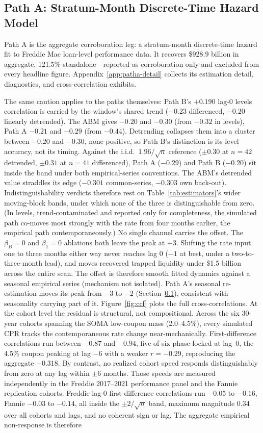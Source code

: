 \documentclass[12pt]{article}
\begin{document}
\subsection{Path A: Stratum-Month Discrete-Time Hazard Model}\label{sec:patha}

Path A is the aggregate corroboration leg: a stratum-month discrete-time hazard fit to Freddie Mac loan-level performance data. It recovers \$928.9 billion in aggregate, 121.5\% standalone---reported as corroboration only and excluded from every headline figure. Appendix~\ref{app:patha-detail} collects its estimation detail, diagnostics, and cross-correlation exhibits.

The same caution applies to the paths themselves: Path B's $+0.190$ lag-0 levels correlation is carried by the window's shared trend ($-0.23$ differenced, $-0.20$ linearly detrended). The ABM gives $-0.20$ and $-0.30$ (from $-0.32$ in levels), Path A $-0.21$ and $-0.29$ (from $-0.44$). Detrending collapses them into a cluster between $-0.20$ and $-0.30$, none positive, so Path B's distinction is its level accuracy, not its timing. Against the i.i.d.\ $1.96/\sqrt{n}$ reference ($\pm 0.30$ at $n = 42$ detrended, $\pm 0.31$ at $n = 41$ differenced), Path A ($-0.29$) and Path B ($-0.20$) sit inside the band under both empirical-series conventions. The ABM's detrended value straddles its edge ($-0.301$ common-series, $-0.303$ own back-out). Indistinguishability verdicts therefore rest on Table~\ref{tab:estimators}'s wider moving-block bands, under which none of the three is distinguishable from zero. (In levels, trend-contaminated and reported only for completeness, the simulated path co-moves most strongly with the rate from four months earlier, the empirical path contemporaneously.) No single channel carries the offset. The $\beta_B = 0$ and $\beta_1 = 0$ ablations both leave the peak at $-3$. Shifting the rate input one to three months either way never reaches lag 0 ($-1$ at best, under a two-to-three-month lead), and moves recovered trapped liquidity under \$1.5 billion across the entire scan. The offset is therefore smooth fitted dynamics against a seasonal empirical series (mechanism not isolated). Path A's seasonal re-estimation moves its peak from $-3$ to $-2$ (Section~\ref{sec:patha}), consistent with seasonality carrying part of it. Figure~\ref{fig:ccf} plots the full cross-correlations. At the cohort level the residual is structural, not compositional. Across the six 30-year cohorts spanning the SOMA low-coupon mass (2.0--4.5\%), every simulated CPR tracks the contemporaneous rate change near-mechanically. First-difference correlations run between $-0.87$ and $-0.94$, five of six phase-locked at lag~0, the 4.5\% coupon peaking at lag $-6$ with a weaker $r=-0.29$, reproducing the aggregate $-0.318$. By contrast, no realized cohort speed responds distinguishably from zero at any lag within $\pm 6$ months. Those speeds are measured independently in the Freddie 2017--2021 performance panel and the Fannie replication cohorts. Freddie lag-0 first-difference correlations run $-0.05$ to $-0.16$, Fannie $-0.03$ to $-0.14$, all inside the $\pm 2/\sqrt{n}$ band, maximum magnitude $0.34$ over all cohorts and lags, and no coherent sign or lag. The aggregate empirical non-response is therefore 
\end{document}
